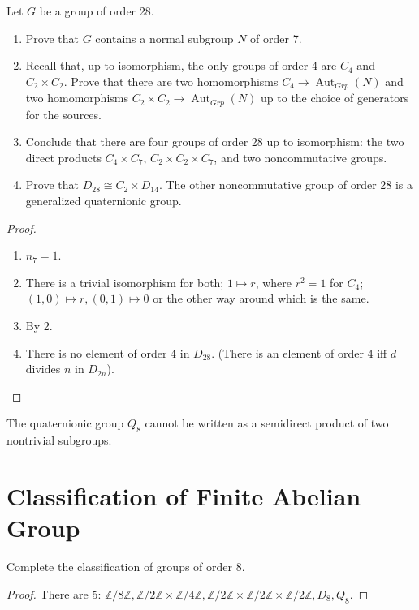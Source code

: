 \documentclass[openany]{book}
\newcommand{\Z}{\mathbb{Z}}
\begin{document}
    
    \begin{prob}[5.15]
    Let $G$ be a group of order 28.
    
    \begin{enumerate}
        \item Prove that $G$ contains a normal subgroup $N$ of order 7.
        \item Recall that, up to isomorphism, the only groups of order 4 are $C_4$ and $C_2 \times C_2$. Prove that there are two homomorphisms $C_4 \to \operatorname{Aut}_{Grp}(N)$ and two homomorphisms $C_2 \times C_2 \to \operatorname{Aut}_{Grp}(N)$ up to the choice of generators for the sources.
        \item Conclude that there are four groups of order 28 up to isomorphism: the two direct products $C_4 \times C_7$, $C_2 \times C_2 \times C_7$, and two noncommutative groups.
        \item Prove that $D_{28} \cong C_2 \times D_{14}$. The other noncommutative group of order 28 is a generalized quaternionic group.
    \end{enumerate}
    \end{prob}
\begin{proof}
    \begin{enumerate}
        \item $n_7=1$.
        \item There is a trivial isomorphism for both; $1\mapsto r$, where $r^2=1$ for $C_4$; $(1,0)\mapsto r, (0,1)\mapsto 0$ or the other way around which is the same.
        \item By 2.
        \item There is no element of order $4$ in $D_{28}$. (There is an element of order $4$ iff $d$ divides $n$ in $D_{2n}$).
    \end{enumerate}
\end{proof}
    
    \begin{prop}[5.16]
    The quaternionic group $Q_8$  cannot be written as a semidirect product of two nontrivial subgroups.
    \end{prop}



\section{Classification of Finite Abelian Group}




\begin{prob}
Complete the classification of groups of order 8.
\end{prob}
\begin{proof}
    There are $5$: $\Z/8\Z, \Z/2\Z\times\Z/4\Z, \Z/2\Z\times\Z/2\Z\times\Z/2\Z, D_8,Q_8$.
\end{proof}
\end{document}
